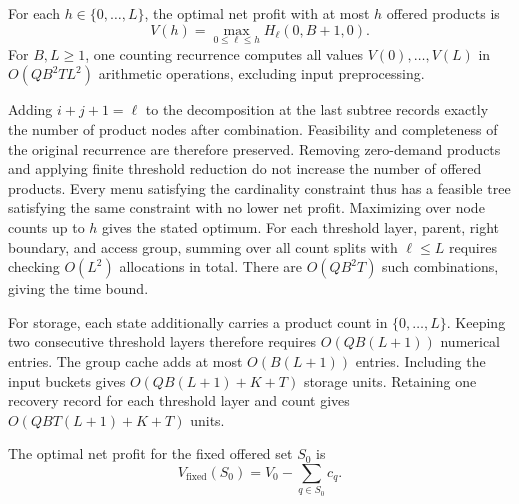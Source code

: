 \begin{corollary}\label{cor:cardinality}
For each $h\in\{0,\ldots,L\}$, the optimal net profit with at most $h$ offered products is
\begin{equation}
V(h)=\max_{0\le\ell\le h}H_\ell(0,B+1,0).
\label{eq:s5_10}
\tag{18}
\end{equation}
For $B,L\ge1$, one counting recurrence computes all values $V(0),\ldots,V(L)$ in $O(QB^2TL^2)$ arithmetic operations, excluding input preprocessing.
\end{corollary}

\begin{IEEEproof}
Adding $i+j+1=\ell$ to the decomposition at the last subtree records exactly the number of product nodes after combination. Feasibility and completeness of the original recurrence are therefore preserved. Removing zero-demand products and applying finite threshold reduction do not increase the number of offered products. Every menu satisfying the cardinality constraint thus has a feasible tree satisfying the same constraint with no lower net profit. Maximizing over node counts up to $h$ gives the stated optimum. For each threshold layer, parent, right boundary, and access group, summing over all count splits with $\ell\le L$ requires checking $O(L^2)$ allocations in total. There are $O(QB^2T)$ such combinations, giving the time bound.

For storage, each state additionally carries a product count in $\{0,\ldots,L\}$. Keeping two consecutive threshold layers therefore requires $O(QB(L+1))$ numerical entries. The group cache adds at most $O(B(L+1))$ entries. Including the input buckets gives $O(QB(L+1)+K+T)$ storage units. Retaining one recovery record for each threshold layer and count gives $O(QBT(L+1)+K+T)$ units.%
\end{IEEEproof}

\begin{corollary}\label{cor:fixed}
The optimal net profit for the fixed offered set $S_0$ is
\begin{equation}
V_{\mathrm{fixed}}(S_0)=V_0-\sum_{q\in S_0}c_q.
\label{eq:s5_11}
\tag{19}
\end{equation}
\end{corollary}

